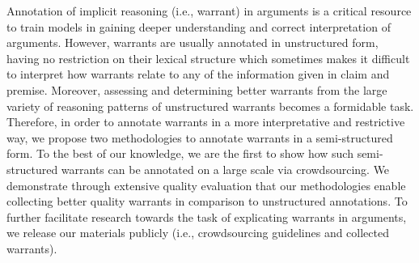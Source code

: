Annotation of implicit reasoning (i.e., warrant) in arguments is a critical resource to train models in gaining deeper understanding and correct interpretation of arguments. However, warrants are usually annotated in unstructured form, having no restriction on their lexical structure which sometimes makes it difficult to interpret how warrants relate to any of the information given in claim and premise. Moreover, assessing and determining better warrants from the large variety of reasoning patterns of unstructured warrants becomes a formidable task. Therefore, in order to annotate warrants in a more interpretative and restrictive way, we propose two methodologies to annotate warrants in a semi-structured form. To the best of our knowledge, we are the first to show how such semi-structured warrants can be annotated on a large scale via crowdsourcing. We demonstrate through extensive quality evaluation that our methodologies enable collecting better quality warrants in comparison to unstructured annotations. To further facilitate research towards the task of explicating warrants in arguments, we release our materials publicly (i.e., crowdsourcing guidelines and collected warrants).
